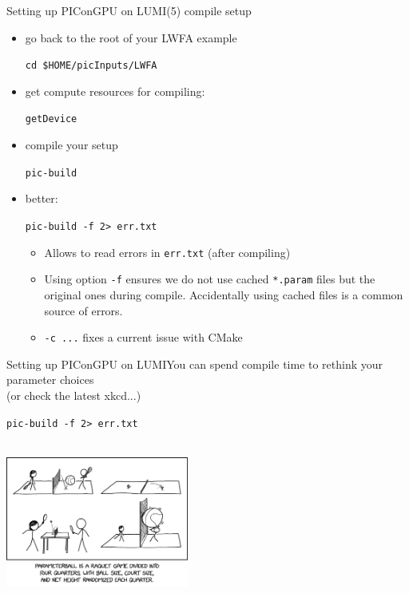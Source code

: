 \documentclass[
  aspectratio=169,
  10pt
]{beamer}
\newcommand{\terminal}[1]{\par\noindent\colorbox{shadecolor}
{\parbox{\dimexpr\textwidth-2\fboxsep\relax}{\texttt{#1}}}}
\begin{document}
\begin{frame}[t,fragile]{Setting up PIConGPU on LUMI}{(5) compile setup}

\begin{itemize}
    \item go back to the root of your LWFA example 
    \terminal{cd \$HOME/picInputs/LWFA}
    \item get compute resources for compiling:
    \terminal{getDevice}
    \item compile your setup
    \terminal{pic-build }
    \item better: 
    \terminal{pic-build  -f 2> err.txt}
    \begin{itemize}
        \item Allows to read errors in \texttt{err.txt} (after compiling)
        \item Using option \texttt{-f} ensures we do not use cached \texttt{*.param} files but the original ones during compile.
            Accidentally using cached files is a common source of errors.
        \item \texttt{-c ...} fixes a current issue with CMake

    \end{itemize}
    \end{itemize}
\end{frame}



\begin{frame}[t,fragile]{Setting up PIConGPU on LUMI}{You can spend compile time to rethink your parameter choices\\(or check the latest xkcd...)}
\begin{center}
    \Large
    \terminal{pic-build -f 2> err.txt}\\
    \vspace{\baselineskip}
    \includegraphics[width=0.45\textwidth]{images/parameterball_2x_xkcd-2852.png}
\end{center}
\end{frame}
\end{document}
